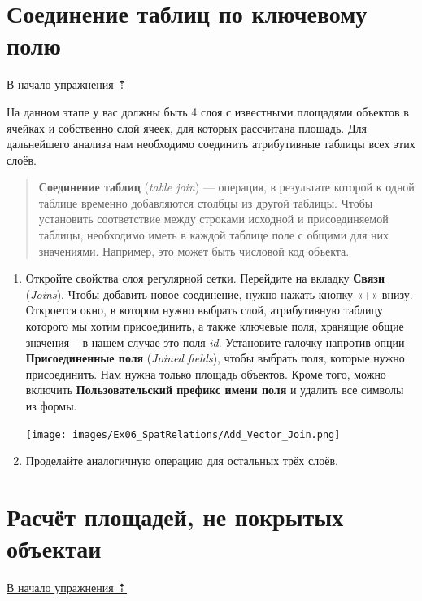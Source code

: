 \documentclass[
  12pt,
]{book}
\begin{document}
\hypertarget{spatrelations-join}{%
\section{Соединение таблиц по ключевому полю}\label{spatrelations-join}}

\protect\hyperlink{spatrelations}{В начало упражнения ⇡}

На данном этапе у вас должны быть 4 слоя с известными площадями объектов в ячейках и собственно слой ячеек, для которых рассчитана площадь. Для дальнейшего анализа нам необходимо соединить атрибутивные таблицы всех этих слоёв.

\begin{quote}
\textbf{Соединение таблиц} (\emph{table join}) --- операция, в результате которой к одной таблице временно добавляются столбцы из другой таблицы. Чтобы установить соответствие между строками исходной и присоединяемой таблицы, необходимо иметь в каждой таблице поле с общими для них значениями. Например, это может быть числовой код объекта.
\end{quote}

\begin{enumerate}
\def\labelenumi{\arabic{enumi}.}
\item
  Откройте свойства слоя регулярной сетки. Перейдите на вкладку \textbf{Связи} (\emph{Joins}). Чтобы добавить новое соединение, нужно нажать кнопку «+» внизу. Откроется окно, в котором нужно выбрать слой, атрибутивную таблицу которого мы хотим присоединить, а также ключевые поля, хранящие общие значения -- в нашем случае это поля \emph{id}. Установите галочку напротив опции \textbf{Присоединенные поля} (\emph{Joined fields}), чтобы выбрать поля, которые нужно присоединить. Нам нужна только площадь объектов. Кроме того, можно включить \textbf{Пользовательский префикс имени поля} и удалить все символы из формы.

  \texttt{[image: images/Ex06\_SpatRelations/Add\_Vector\_Join.png]}
\item
  Проделайте аналогичную операцию для остальных трёх слоёв.
\end{enumerate}

\hypertarget{spatrelations-other}{%
\section{Расчёт площадей, не покрытых объектаи}\label{spatrelations-other}}

\protect\hyperlink{spatrelations}{В начало упражнения ⇡}
\end{document}
